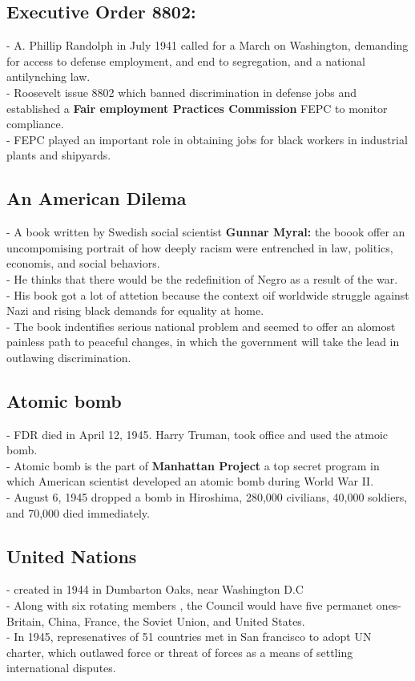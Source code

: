 \documentclass{article}
\begin{document}
\subsection{Executive Order 8802:}
- A. Phillip Randolph in July 1941 called for a March on Washington, demanding for access to defense employment, and end to segregation, and a national antilynching law.\\
- Roosevelt issue 8802 which banned discrimination in defense jobs and established a \textbf{Fair employment Practices Commission} FEPC to monitor compliance.\\
- FEPC played an important role in obtaining jobs for black workers in industrial plants and shipyards.\\

\subsection{ An American Dilema}
- A book written  by Swedish social scientist \textbf{ Gunnar Myral:} the boook offer an uncompomising portrait of how deeply racism were entrenched in law, politics, economis, and social behaviors. \\
- He thinks that there would be the redefinition of Negro as a result of the war.\\
- His book got a lot of attetion because the context oif worldwide struggle against Nazi and rising black demands for equality at home.\\
- The book indentifies serious national problem and seemed to offer an alomost painless path to peaceful changes, in which the government will take the lead in outlawing discrimination.\\

\subsection { Atomic bomb}
- FDR died in April 12, 1945. Harry Truman, took office and used the atmoic bomb.\\
- Atomic bomb is the part of \textbf{Manhattan Project} a top secret program in which American scientist developed an atomic bomb during World War II.\\
- August 6, 1945 dropped a bomb in Hiroshima, 280,000 civilians, 40,000 soldiers, and 70,000 died immediately.\\

\subsection{ United Nations}
- created in 1944 in Dumbarton Oaks, near Washington D.C\\
- Along with six rotating members , the Council would have five permanet ones- Britain, China, France, the Soviet Union, and United States.\\
- In 1945, represenatives of 51 countries met in San francisco to adopt UN charter, which outlawed force or threat of forces as a means of settling international disputes.\\
\end{document}
